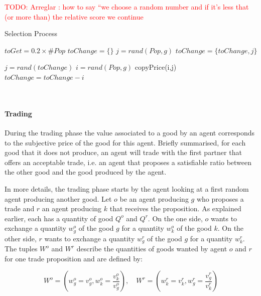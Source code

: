 \documentclass{wscpaperproc}
\newcommand{\memo}[2]{\textcolor{#1}{#2}}
\newcommand{\todo}[1]{\memo{red}{TODO: #1\\}}
\begin{document}
\todo{Arreglar : how to say ``we choose a random number and if it's less that (or more than) the relative score we continue}
\begin{algorithm}
\caption{Selection Process}
\label{algo:selectionCulture}
	\begin{algorithmic}[1]
	\scriptsize
	\State	$toGet = 0.2 \times \#Pop$
		\State	$toChange = \{\}$
			\State $ j = rand(Pop,g) $ 
				\State $toChange = \{toChange,j\}$
			\EndIf
		\EndWhile

			\State $ j = rand(toChange) $ 
			\State $ i = rand(Pop,g) $ 
				\State copyPrice(i,j)	
				\State $toChange = toChange - i$
			\EndIf

		\EndWhile\
	\EndFor
\end{algorithmic}
\end{algorithm}

\paragraph{Trading} 
During the trading phase the value associated to a good by an agent corresponds to the subjective price of the good for this agent. Briefly summarised, for each good that it does not produce, an agent will trade with the first partner that offers an acceptable trade, i.e. an agent that proposes a satisfiable ratio between the other good and the good produced by the agent. 

In more details, the trading phase starts by the agent looking at a first random agent producing another good. 
Let $o$ be an agent producing $g$ who proposes a trade and $r$ an agent producing $k$ that receives the proposition. As explained earlier, each has a quantity of good $Q^o$ and $Q^r$. On the one side, $o$ wants to exchange a quantity $w_g^o$ of the good $g$ for a quantity $w_k^o$ of the good $k$. On the other side, $r$ wants to exchange a quantity $w_g^r$ of the good $g$ for a quantity $w_k^r$. The tuples $W^o$ and $W^r$ describe the quantities of goods wanted by agent $o$ and $r$ for one trade proposition and are defined by:  

\begin{equation}
	 W^o=(w_g^o = v_g^o,w_k^o= \frac{v_k^o}{v_g^o}), \quad
	 W^r=(w_k^r = v_k^r,w_g^r= \frac{v_g^r}{v_k^r}) 
	 \label{eq:trade}
\end{equation}
\end{document}
